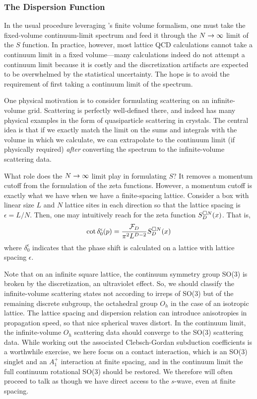 \subsubsection{The Dispersion Function}\label{sec:dispersion}

In the usual procedure leveraging \Luscher's finite volume formalism, one must take the fixed-volume continuum-limit spectrum and feed it through the $N\rightarrow\infty$ limit of the $S$ function.
In practice, however, most lattice QCD calculations cannot take a continuum limit in a fixed volume---many calculations indeed do not attempt a continuum limit because it is costly and the discretization artifacts are expected to be overwhelmed by the statistical uncertainty.
The hope is to avoid the requirement of first taking a continuum limit of the spectrum.

One physical motivation is to consider formulating scattering on an infinite-volume grid.
Scattering is perfectly well-defined there, and indeed has many physical examples in the form of quasiparticle scattering in crystals.
The central idea is that if we exactly match the limit on the sums and integrals with the volume in which we calculate, we can extrapolate to the continuum limit (if physically required) \emph{after} converting the spectrum to the infinite-volume scattering data.

What role does the $N\rightarrow\infty$ limit play in formulating $S$?
It removes a momentum cutoff from the formulation of the zeta functions.
However, a momentum cutoff is exactly what we have when we have a finite-spacing lattice.
Consider a box with linear size $L$ and $N$ lattice sites in each direction so that the lattice spacing is $\epsilon=L/N$.
Then, one may intuitively reach for the zeta function $S_D^{\square N}(x)$.  That is,
\begin{equation}\label{eq:cutoff cartesian S}
    \cot \delta_0^\epsilon(p) = \frac{\mathcal{F}_D}{\pi^2 L^{D-2}} S_D^{\square N}(x)
\end{equation}
where $\delta_0^\epsilon$ indicates that the phase shift is calculated on a lattice with lattice spacing $\epsilon$.

Note that on an infinite square lattice, the continuum symmetry group SO(3) is broken by the discretization, an ultraviolet effect.
So, we should classify the infinite-volume scattering states not according to irreps of SO(3) but of the remaining discrete subgroup, the octahedral group $O_h$ in the case of an isotropic lattice.
The lattice spacing and dispersion relation can introduce anisotropies in propagation speed, so that nice spherical waves distort.
In the continuum limit, the infinite-volume $O_h$ scattering data should converge to the SO(3) scattering data.
While working out the associated Clebsch-Gordan subduction coefficients is a worthwhile exercise, we here focus on a contact interaction, which is an SO(3) singlet and an $A_1^+$ interaction at finite spacing, and in the continuum limit the full continuum rotational SO(3) should be restored.
We therefore will often proceed to talk as though we have direct access to the $s$-wave, even at finite spacing.

